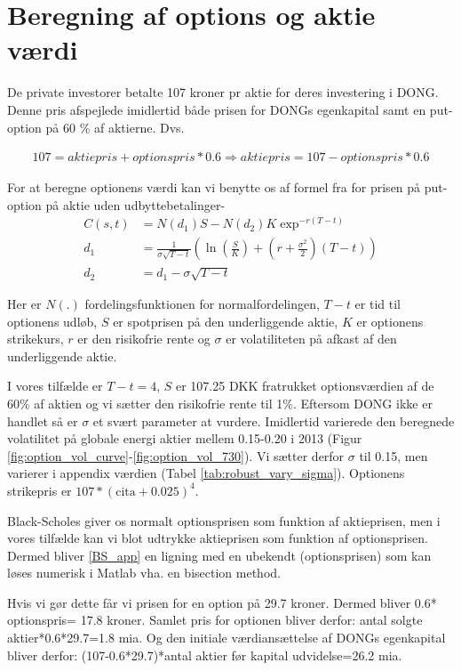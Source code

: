 \documentclass{article}
\begin{document}
\section{Beregning af options og aktie værdi}
\label{sec:app_option}

De private investorer betalte 107 kroner pr aktie for deres investering i DONG. Denne pris afspejlede imidlertid både prisen for DONGs egenkapital samt en put-option på 60 \% af aktierne. Dvs.

\begin{align}
107=aktiepris+optionspris*0.6 \Rightarrow aktiepris= 107-optionspris*0.6
\end{align}

For at beregne optionens værdi kan vi benytte os af formel fra  \cite{Black1973} for prisen på put-option på aktie uden udbyttebetalinger-
\begin{align}
C(s,t)&=N(d_1)S-N(d_2)K \exp^{-r(T-t)} \\
d_1&= \frac{1}{\sigma\sqrt{T-t}}\left( \ln\left( \frac{S}{K} \right)+\left(r+\frac{\sigma^2}{2} \right)(T-t) \right) \nonumber \\
d_2&=d_1-\sigma \sqrt{T-t} \nonumber \label{BS_app}
\end{align}

Her er $N(.)$ fordelingsfunktionen for normalfordelingen, $T-t$ er tid til optionens udløb, $S$ er spotprisen på den underliggende aktie, $K$ er optionens strikekurs, $r$ er den risikofrie rente og $\sigma$ er volatiliteten på afkast af den underliggende aktie. 

I vores tilfælde er $T-t=4$, $S$ er 107.25 DKK fratrukket optionsværdien af de 60\% af aktien og vi sætter den risikofrie rente til 1\%. Eftersom DONG ikke er handlet så er $\sigma$ et svært parameter at vurdere. Imidlertid varierede den  beregnede volatilitet på globale energi aktier mellem 0.15-0.20 i 2013 (Figur \ref{fig:option_vol_curve}-\ref{fig:option_vol_730}). Vi sætter derfor $\sigma$ til 0.15, men varierer i appendix værdien (Tabel \ref{tab:robust_vary_sigma}). Optionens strikepris er $107*(\mathrm{cita}+0.025)^4$.

Black-Scholes giver os normalt optionsprisen som funktion af aktieprisen, men i vores tilfælde kan vi blot udtrykke aktieprisen som funktion af optionsprisen. Dermed bliver \eqref{BS_app} en ligning med en ubekendt (optionsprisen) som kan løses numerisk i Matlab vha. en bisection method.

Hvis vi gør dette får vi prisen for en option på 29.7 kroner. Dermed bliver 0.6* optionspris= 17.8 kroner. 
Samlet pris for optionen bliver derfor: antal solgte aktier*0.6*29.7=1.8 mia.  Og den initiale værdiansættelse af DONGs egenkapital bliver derfor: (107-0.6*29.7)*antal aktier før kapital udvidelse=26.2 mia. 
\end{document}
